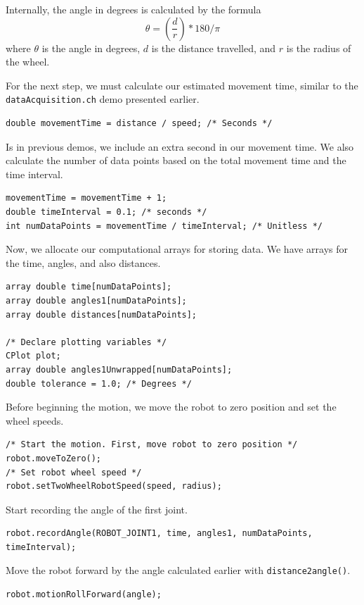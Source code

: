 \documentclass{article}
\begin{document}
Internally, the angle in degrees is calculated by the formula
\begin{equation*}
\theta  = \left(\frac{d}{r} \right) * 180 / \pi
\end{equation*}
where $\theta$ is the angle in degrees, $d$ is the distance travelled, 
and $r$ is the radius of the wheel.

For the next step, we must calculate our estimated movement time, similar to the
\texttt{dataAcquisition.ch} demo presented earlier. 
\begin{verbatim}
double movementTime = distance / speed; /* Seconds */
\end{verbatim}

Is in previous demos, we include an extra second in our movement time. We
also calculate the number of data points based on the total movement time
and the time interval.
\begin{verbatim}
movementTime = movementTime + 1; 
double timeInterval = 0.1; /* seconds */
int numDataPoints = movementTime / timeInterval; /* Unitless */
\end{verbatim}

Now, we allocate our computational arrays for storing data. We have arrays 
for the time, angles, and also distances.
\begin{verbatim}
array double time[numDataPoints];
array double angles1[numDataPoints];
array double distances[numDataPoints];

/* Declare plotting variables */
CPlot plot;
array double angles1Unwrapped[numDataPoints];
double tolerance = 1.0; /* Degrees */
\end{verbatim}

Before beginning the motion, we move the robot to zero position and set the 
wheel speeds.
\begin{verbatim}
/* Start the motion. First, move robot to zero position */
robot.moveToZero();
/* Set robot wheel speed */
robot.setTwoWheelRobotSpeed(speed, radius);
\end{verbatim}

Start recording the angle of the first joint.
\begin{verbatim}
robot.recordAngle(ROBOT_JOINT1, time, angles1, numDataPoints, timeInterval);
\end{verbatim}

Move the robot forward by the angle calculated earlier with \texttt{distance2angle()}.
\begin{verbatim}
robot.motionRollForward(angle);
\end{verbatim}
\end{document}
